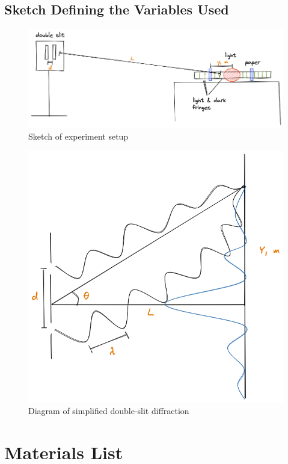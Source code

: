 \documentclass[12pt]{article}
\begin{document}
\subsection{Sketch Defining the Variables Used}

\begin{figure}[H]
	\centering
\includegraphics[scale=0.57]{diagram.png}
\caption{Sketch of experiment setup}
\end{figure}

\begin{figure}[H]
\centering
\includegraphics[scale=0.48]{sketch.png}
\caption{Diagram of simplified double-slit diffraction}
\end{figure}

\section{Materials List}
\end{document}
